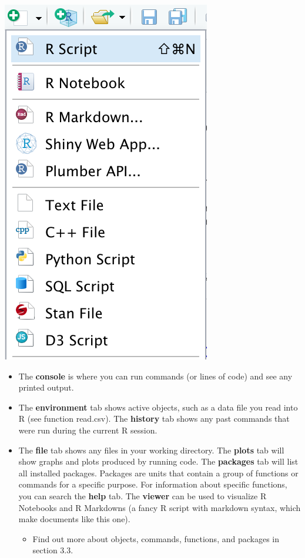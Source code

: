 \documentclass[
]{book}
\providecommand{\tightlist}{%
  \setlength{\itemsep}{0pt}\setlength{\parskip}{0pt}}
\begin{document}
\begin{center}\includegraphics[width=0.5\linewidth]{img/SourceFileTypes} \end{center}

\begin{itemize}
\item
  The \textbf{console} is where you can run commands (or lines of code) and see any printed output.
\item
  The \textbf{environment} tab shows active objects, such as a data file you read into R (see function read.csv). The \textbf{history} tab shows any past commands that were run during the current R session.
\item
  The \textbf{file} tab shows any files in your working directory. The \textbf{plots} tab will show graphs and plots produced by running code. The \textbf{packages} tab will list all installed packages. Packages are units that contain a group of functions or commands for a specific purpose. For information about specific functions, you can search the \textbf{help} tab. The \textbf{viewer} can be used to visualize R Notebooks and R Markdowns (a fancy R script with markdown syntax, which make documents like this one).

  \begin{itemize}
  \tightlist
  \item
    Find out more about objects, commands, functions, and packages in section 3.3.
  \end{itemize}
\end{itemize}
\end{document}
